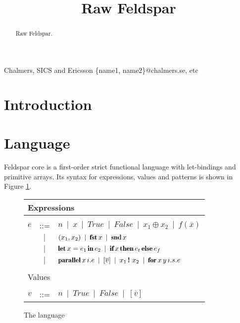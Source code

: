 \documentclass[natbib]{sigplanconf}
\newcommand{\kw}[1]{\mbox{\fontfamily{cmr}\fontseries{b}\selectfont#1}}
\newcommand{\alt}{\;\:\vert\;\:}
\newcommand{\IF}{\kw{if}\,}
\newcommand{\THEN}{\,\kw{then}\,}
\newcommand{\ELSE}{\,\kw{else}\,}
\newcommand{\LET}{\kw{let}\,}
\newcommand{\IN}{\,\kw{in}\,}
\newcommand{\PARALLEL}{\kw{parallel}\,}
\newcommand{\FOR}{\kw{for}\,}
\newcommand{\INDEX}{\,\kw{!}\,\,}
\newcommand{\TRUE}{True}
\newcommand{\FALSE}{False}
\newcommand{\ARRAY}[1]{[#1]}
\newcommand{\FST}{\kw{fst}\,}
\newcommand{\SND}{\kw{snd}\,}
\begin{document}




\title{Raw Feldspar}

           {Chalmers, SICS and Ericsson}
           {\{name1, name2\}@chalmers.se, etc}

\maketitle

\begin{abstract}
Raw Feldspar.
\end{abstract}

\section{Introduction}

\section{Language}
\label{sec:lang}

Feldspar core is a first-order strict functional language 
with let-bindings and primitive arrays. Its syntax for expressions,
values and patterns is shown in Figure \ref{fig:language}.

\begin{figure}
\begin{tabular}{lll}
\multicolumn{3}{l}{Expressions} \\ \hline \\
  $e$ &::= & $n \alt x \alt \TRUE \alt \FALSE  \alt x_1
      \oplus  x_2
      \alt  f(\overline{x})$ \\
 &  $\alt$ & $(x_1, x_2) \alt \FST x \alt \SND x$ \\ 
 &  $\alt$ & $\LET x = e_1 \IN e_2 \alt \IF x \THEN e_t \ELSE e_f$ \\ 
 &  $\alt$ & $\PARALLEL x\, i.e \alt \ARRAY{\overline{v}} \alt  x_1 \INDEX x_2 \alt
              \FOR x\, y\, i.s.e$\\
\\
\multicolumn{3}{l}{Values} \\ \hline \\
  $v$ &::= & $n  \alt \TRUE \alt \FALSE \alt \ARRAY{\overline{v}}$ \\
\end{tabular}  
\caption{The language}
\label{fig:language}
\end{figure}
\end{document}
